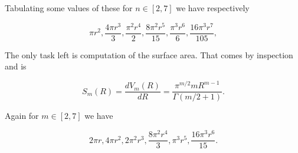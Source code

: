 {Tabulating some values of these for $n \in [2, 7]$ we have respectively

\begin{equation}\label{eqn:basicStatMechProblemSet3Problem1:580}
\pi  r^2,\frac{4 \pi  r^3}{3},\frac{\pi ^2 r^4}{2},\frac{8 \pi ^2 r^5}{15},\frac{\pi ^3 r^6}{6},\frac{16 \pi ^3 r^7}{105},
\end{equation}

The only task left is computation of the surface area.  That comes by inspection and is

\begin{equation}\label{eqn:basicStatMechProblemSet3Problem1:560}
S_{m}(R) 
=\frac{d V_m(R)}{d R}
= \frac{\pi^{m/2} m R^{m-1}}{\Gamma\left( m/2 + 1 \right)}.
\end{equation}

Again for $m \in [2, 7]$ we have

\begin{equation}\label{eqn:basicStatMechProblemSet3Problem1:600}
2 \pi  r,4 \pi  r^2,2 \pi ^2 r^3,\frac{8 \pi ^2 r^4}{3},\pi ^3 r^5,\frac{16 \pi ^3 r^6}{15}.
\end{equation}
}
